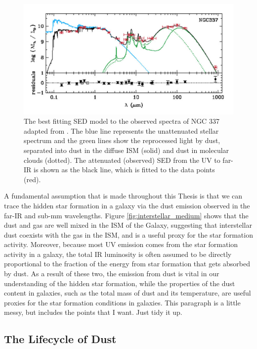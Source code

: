 \begin{figure}
    \centering
	\includegraphics[width=0.9\columnwidth]{Figures/unattenuated_attenuated_sed.pdf}
	\caption{The best fitting SED model to the observed spectra of NGC 337 adapted from \citealt{daCunha_2008}. The blue line represents the unattenuated stellar spectrum and the green lines show the reprocessed light by dust, separated into dust in the diffuse ISM (solid) and dust in molecular clouds (dotted). The attenuated (observed) SED from the UV to far-IR is shown as the black line, which is fitted to the data points (red).}
	\label{fig:unattenuated_attenuated_sed}
\end{figure}

A fundamental assumption that is made throughout this Thesis is that we can trace the hidden star formation in a galaxy via the dust emission observed in the far-IR and sub-mm wavelengths. Figure \ref{fig:interstellar_medium} shows that the dust and gas are well mixed in the ISM of the Galaxy, suggesting that interstellar dust coexists with the gas in the ISM, and is a useful proxy for the star formation activity. Moreover, because most UV emission comes from the star formation activity in a galaxy, the total IR luminosity is often assumed to be directly proportional to the fraction of the energy from star formation that gets absorbed by dust. As a result of these two, the emission from dust is vital in our understanding of the hidden star formation, while the properties of the dust content in galaxies, such as the total mass of dust and its temperature, are useful proxies for the star formation conditions in galaxies.
{\color{red}This paragraph is a little messy, but includes the points that I want. Just tidy it up.}

\subsection{The Lifecycle of Dust}

